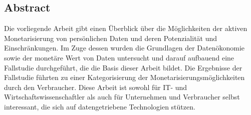 \thispagestyle{empty}
\vspace*{5cm}
\begin{center}
\begin{minipage}{0.9\textwidth}
\chapter*{Abstract}

Die vorliegende Arbeit gibt einen Überblick über die Möglichkeiten der aktiven Monetarisierung von persönlichen Daten und deren Potenzialität und Einschränkungen. Im Zuge dessen wurden die Grundlagen der Datenökonomie sowie der monetäre Wert von Daten untersucht und darauf aufbauend eine Fallstudie durchgeführt, die die Basis dieser Arbeit bildet. Die Ergebnisse der Fallstudie führten zu einer Kategorisierung der Monetarisierungsmöglichkeiten durch den Verbraucher. Diese Arbeit ist sowohl für IT- und Wirtschaftswissenschaftler als auch für Unternehmen und Verbraucher selbst interessant, die sich auf datengetriebene Technologien stützen.

\vspace*{1.5cm}
\end{minipage}
\end{center}
\clearpage